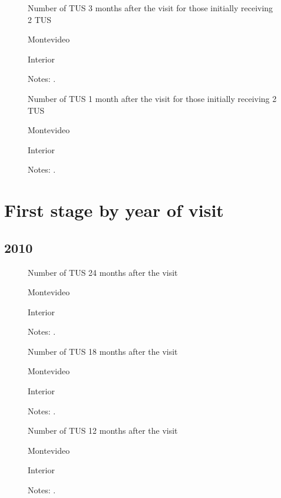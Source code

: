 \documentclass[12pt]{article}
\begin{document}
\begin{figure}[H]%
	\caption{Number of TUS 3 months after the visit for those initially receiving 2 TUS}%
	\centering
	\caption*{ {Montevideo}}
	\qquad
	\caption*{Interior}
	\label{fig:first_stage_si2Tus_tus3}%
	\caption*{ {\footnotesize Notes: .}}
\end{figure}

\begin{figure}[H]%
	\caption{Number of TUS 1 month after the visit for those initially receiving 2 TUS}%
	\centering
	\caption*{ {Montevideo}}
	\qquad
	\caption*{Interior}
	\label{fig:first_stage_si2Tus_tus1}%
	\caption*{ {\footnotesize Notes: .}}
\end{figure}

\section{First stage by year of visit}

\subsection{2010}

\begin{figure}[H]%
	\caption{Number of TUS 24 months after the visit}%
	\centering
	\caption*{ {Montevideo}}
	\qquad
	\caption*{Interior}
	\label{fig:first_stage_2010_tus24}%
	\caption*{ {\footnotesize Notes: .}}
\end{figure}

\begin{figure}[H]%
	\caption{Number of TUS 18 months after the visit}%
	\centering
	\caption*{ {Montevideo}}
	\qquad
	\caption*{Interior}
	\label{fig:first_stage_2010_tus18}%
	\caption*{ {\footnotesize Notes: .}}
\end{figure}

\begin{figure}[H]%
	\caption{Number of TUS 12 months after the visit}%
	\centering
	\caption*{ {Montevideo}}
	\qquad
	\caption*{Interior}
	\label{fig:first_stage_2010_tus12}%
	\caption*{ {\footnotesize Notes: .}}
\end{figure}
\end{document}
